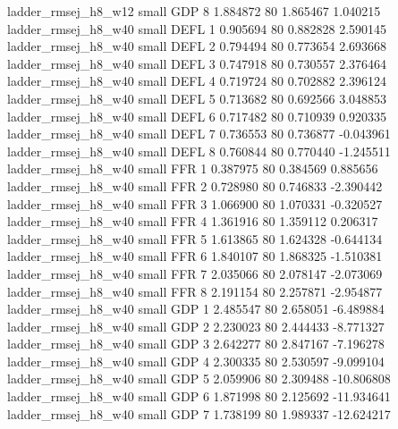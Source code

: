      ladder_rmsej_h8_w12      small      GDP                 8 1.884872 80       1.865467           1.040215
     ladder_rmsej_h8_w40      small     DEFL                 1 0.905694 80       0.882828           2.590145
     ladder_rmsej_h8_w40      small     DEFL                 2 0.794494 80       0.773654           2.693668
     ladder_rmsej_h8_w40      small     DEFL                 3 0.747918 80       0.730557           2.376464
     ladder_rmsej_h8_w40      small     DEFL                 4 0.719724 80       0.702882           2.396124
     ladder_rmsej_h8_w40      small     DEFL                 5 0.713682 80       0.692566           3.048853
     ladder_rmsej_h8_w40      small     DEFL                 6 0.717482 80       0.710939           0.920335
     ladder_rmsej_h8_w40      small     DEFL                 7 0.736553 80       0.736877          -0.043961
     ladder_rmsej_h8_w40      small     DEFL                 8 0.760844 80       0.770440          -1.245511
     ladder_rmsej_h8_w40      small      FFR                 1 0.387975 80       0.384569           0.885656
     ladder_rmsej_h8_w40      small      FFR                 2 0.728980 80       0.746833          -2.390442
     ladder_rmsej_h8_w40      small      FFR                 3 1.066900 80       1.070331          -0.320527
     ladder_rmsej_h8_w40      small      FFR                 4 1.361916 80       1.359112           0.206317
     ladder_rmsej_h8_w40      small      FFR                 5 1.613865 80       1.624328          -0.644134
     ladder_rmsej_h8_w40      small      FFR                 6 1.840107 80       1.868325          -1.510381
     ladder_rmsej_h8_w40      small      FFR                 7 2.035066 80       2.078147          -2.073069
     ladder_rmsej_h8_w40      small      FFR                 8 2.191154 80       2.257871          -2.954877
     ladder_rmsej_h8_w40      small      GDP                 1 2.485547 80       2.658051          -6.489884
     ladder_rmsej_h8_w40      small      GDP                 2 2.230023 80       2.444433          -8.771327
     ladder_rmsej_h8_w40      small      GDP                 3 2.642277 80       2.847167          -7.196278
     ladder_rmsej_h8_w40      small      GDP                 4 2.300335 80       2.530597          -9.099104
     ladder_rmsej_h8_w40      small      GDP                 5 2.059906 80       2.309488         -10.806808
     ladder_rmsej_h8_w40      small      GDP                 6 1.871998 80       2.125692         -11.934641
     ladder_rmsej_h8_w40      small      GDP                 7 1.738199 80       1.989337         -12.624217
